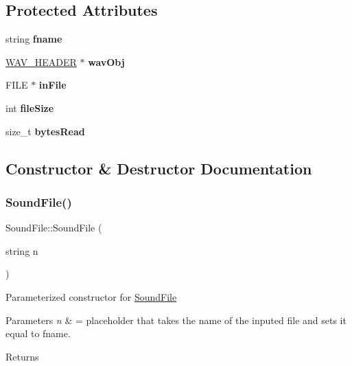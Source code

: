 \subsection*{Protected Attributes}
\begin{DoxyCompactItemize}
\item 
\mbox{\label{classSoundFile_ac34b46bf2c239d2648306a965bacb264}} 
string {\bfseries fname}
\item 
\mbox{\label{classSoundFile_aea1d25c118ce931996eaf4c1bdbf8856}} 
\hyperlink{structWAV__HEADER}{W\+A\+V\+\_\+\+H\+E\+A\+D\+ER} $\ast$ {\bfseries wav\+Obj}
\item 
\mbox{\label{classSoundFile_a5a4ae3b5a9f6d5e74a5049a8597ac260}} 
F\+I\+LE $\ast$ {\bfseries in\+File}
\item 
\mbox{\label{classSoundFile_af79618b6e627b20b3c948d054156f4a4}} 
int {\bfseries file\+Size}
\item 
\mbox{\label{classSoundFile_a2b0a6c8abf5161292caf408efcc659d9}} 
size\+\_\+t {\bfseries bytes\+Read}
\end{DoxyCompactItemize}


\subsection{Constructor \& Destructor Documentation}
\mbox{\label{classSoundFile_ad51984b0112e70cae3158b17ab2e3466}} 
\subsubsection{\texorpdfstring{Sound\+File()}{SoundFile()}\hspace{0.1cm}{\footnotesize\ttfamily [1/2]}}
{\footnotesize\ttfamily Sound\+File\+::\+Sound\+File (\begin{DoxyParamCaption}\item[{string}]{n }\end{DoxyParamCaption})}

Parameterized constructor for \hyperlink{classSoundFile}{Sound\+File} 
\begin{DoxyParams}{Parameters}
{\em n} & = placeholder that takes the name of the inputed file and sets it equal to fname. \\
\hline
\end{DoxyParams}
\begin{DoxyReturn}{Returns}

\end{DoxyReturn}
\mbox{\label{classSoundFile_a2a4cc3a7780cc699e1ef51fc98f5d846}} 
